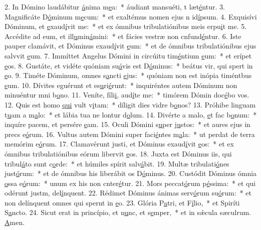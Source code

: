 2. In Dómino laudábitur \uline{á}nima m\uline{e}a:~* áudiant mansuéti, t læt\uline{é}ntur.
3. Magnificáte D\uline{ó}minum m\uline{e}cum:~* et exaltémus nomen ejus n id\uline{í}psum.
4. Exquisívi Dóminum, et \uline{e}xaud\uline{í}vit me:~* et ex ómnibus tribulatiónibus meis erpu\uline{i}t me.
5. Accédite ad eum, et ill\uline{u}min\uline{á}mini:~* et fácies vestræ non cnfund\uline{é}ntur.
6. Iste pauper clamávit, et Dóminus exaud\uline{í}vit \uline{e}um:~* et de ómnibus tribulatiónibus ejus salvvit \uline{e}um.
7. Immíttet Angelus Dómini in circúitu tim\uline{é}ntium \uline{e}um:~* et erípet \uline{e}os.
8. Gustáte, et vidéte quóniam su\uline{á}vis est D\uline{ó}minus:~* beátus vir, qui spert in \uline{e}o.
9. Timéte Dóminum, omnes s\uline{a}ncti \uline{e}jus:~* quóniam non est inópia timéntbus \uline{e}um.
10. Dívites eguérunt et es\uline{u}ri\uline{é}runt:~* inquiréntes autem Dóminum non minuéntur mni b\uline{o}no.
11. Veníte, fíli\uline{i}, aud\uline{í}te me:~* timórem Dómin doc\uline{é}bo vos.
12. Quis est homo \uline{qui} vult v\uline{i}tam:~* díligit dies vidre b\uline{o}nos?
13. Próhibe linguam t\uline{u}am a m\uline{a}lo:~* et lábia tua ne lontur d\uline{o}lum.
14. Divérte a malo, \uline{e}t fac b\uline{o}num:~* inquíre pacem, et persére \uline{e}am.
15. Oculi Dómini s\uline{u}per j\uline{u}stos:~* et aures ejus in precs e\uline{ó}rum.
16. Vultus autem Dómini super faci\uline{é}ntes m\uline{a}la:~* ut perdat de terra memórim e\uline{ó}rum.
17. Clamavérunt justi, et Dóminus exaud\uline{í}vit \uline{e}os:~* et ex ómnibus tribulatiónibus eórum libervit \uline{e}os.
18. Juxta est Dóminus iis, qui tribul\uline{á}to sunt c\uline{o}rde:~* et húmiles spírit salv\uline{á}bit.
19. Multæ tribulati\uline{ó}nes just\uline{ó}rum:~* et de ómnibus his liberábit os D\uline{ó}minus.
20. Custódit Dóminus ómnia \uline{o}ssa e\uline{ó}rum:~* unum ex his non cnter\uline{é}tur.
21. Mors peccat\uline{ó}rum p\uline{é}ssima:~* et qui odérunt justm, del\uline{í}nquent.
22. Rédimet Dóminus ánimas serv\uline{ó}rum su\uline{ó}rum:~* et non delínquent omnes qui spernt in \uline{e}o.
23. Glória P\uline{a}tri, et F\uline{í}lio,~* et Spiríti S\uline{a}ncto.
24. Sicut erat in princípio, et n\uline{u}nc, et s\uline{e}mper,~* et in sǽcula sæculrum. \uline{A}men.
